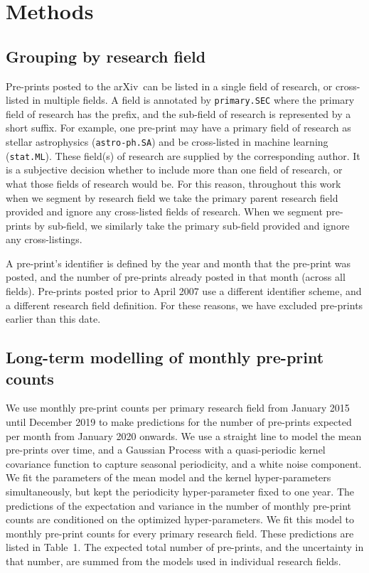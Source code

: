 \documentclass[a4paper,12pt]{article}
\newcommand{\arxiv}{arXiv}
\begin{document}


\newpage


\section*{Methods}

\subsection*{Grouping by research field}

Pre-prints posted to the \arxiv\ can be listed in a single field of research, or cross-listed in multiple fields. A field is annotated by \texttt{primary.SEC} where the primary field of research has the prefix, and the sub-field of research is represented by a short suffix. For example, one pre-print may have a primary field of research as stellar astrophysics (\texttt{astro-ph.SA}) and be cross-listed in machine learning (\texttt{stat.ML}). These field(s) of research are supplied by the corresponding author. It is a subjective decision whether to include more than one field of research, or what those fields of research would be. For this reason, throughout this work when we segment by research field we take the primary parent research field provided and ignore any cross-listed fields of research. When we segment pre-prints by sub-field, we similarly take the primary sub-field provided and ignore any cross-listings.

A pre-print's identifier is defined by the year and month that the pre-print was posted, and the number of pre-prints already posted in that month (across all fields). Pre-prints posted prior to April 2007 use a different identifier scheme, and a different research field definition. For these reasons, we have excluded pre-prints earlier than this date. 


\subsection*{Long-term modelling of monthly pre-print counts}

We use monthly pre-print counts per primary research field from January 2015 until December 2019 to make predictions for the number of pre-prints expected per month from January 2020 onwards. We use a straight line to model the mean pre-prints over time, and a Gaussian Process with a quasi-periodic kernel covariance function to capture seasonal periodicity\cite{Rasmussen:2006,Ambikasaran:2014}, and a white noise component. We fit the parameters of the mean model and the kernel hyper-parameters simultaneously, but kept the periodicity hyper-parameter fixed to one year. The predictions of the expectation and variance in the number of monthly pre-print counts are conditioned on the optimized hyper-parameters. We fit this model to monthly pre-print counts for every primary research field. These predictions are listed in Table~1. The expected total number of pre-prints, and the uncertainty in that number, are summed from the models used in individual research fields. 
\end{document}
